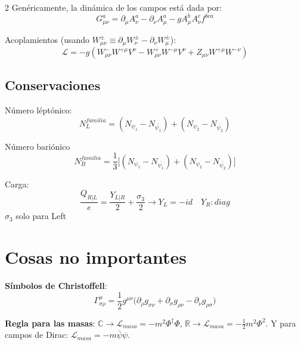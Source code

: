 \documentclass[12pt]{article}
\begin{document}
\begin{multicols}{2}
        Genéricamente, la dinámica de los campos está dada por:
        \begin{equation*}
            G_{\mu\nu}^{a} = \partial_{\mu}A_{\nu}^{a} - \partial_{\nu}A_{\mu}^{a} - gA_{\mu}^{b}A_{\nu}^{c}f^{bca}
        \end{equation*}

        Acoplamientos (usando $W_{\mu\nu}^{\pm} \equiv \partial_\mu W_{\nu}^{\pm} - \partial_{\nu}W^{\pm}_{\mu}$):
        \begin{equation*}
            \mathcal{L} = -g(W_{\mu\nu}^{-}W^{+\mu}V^\nu - W_{\mu\nu}^{+}W^{-\mu}V^\nu + Z_{\mu\nu}W^{+\mu}W^{-\nu})
        \end{equation*}
        
        \subsection*{Conservaciones}
        Número léptónico:
        \begin{equation*}
            N_L^{familia} = (N_{\psi_1} - N_{\bar{\psi_1}}) + (N_{\psi_2} - N_{\bar{\psi_2}})
        \end{equation*}

        Número bariónico
        \begin{equation*}
            N_B^{familia} = \frac13 \bigg[(N_{\psi_1} - N_{\bar{\psi_1}}) + (N_{\psi_2} - N_{\bar{\psi_2}})\bigg]
        \end{equation*}

        Carga:
        \begin{equation*}
            \frac{Q_{R|L}}{e} = \frac{Y_{L|R}}{2} + \frac{\sigma_3}{2} \rightarrow Y_L = -id \quad Y_R:diag
        \end{equation*}
        $\sigma_3$ solo para Left

        \section*{Cosas no importantes}
        \textbf{Símbolos de Christoffell}:
        \begin{equation*}
            \Gamma^{\mu}_{\sigma\rho} = \frac{1}{2} g^{\mu\nu} \bigg(\partial_{\rho} g_{\sigma\nu} + \partial_{\sigma} g_{\rho\nu} - \partial_{\nu} g_{\rho\sigma} \bigg)
        \end{equation*}

        \textbf{Regla para las masas}: $\mathbb{C} \rightarrow \mathcal{L}_{masa} = - m^{2} \Phi^{\dagger}\Phi$, $\mathbb{R} \rightarrow \mathcal{L}_{masa} = - \frac12 m^{2} \Phi^{2}$. Y para campos de Dirac: $\mathcal{L}_{masa} = -m \bar{\psi}\psi$.


\end{multicols}
\end{document}
